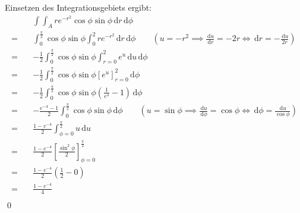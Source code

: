 \documentclass[answers]{exam}
\renewcommand{\d}{\,\mathrm{d}}
\begin{document}
\begin{questions}
\begin{parts}
\begin{solution}
            Einsetzen des Integrationsgebiets ergibt:
            $$
                \begin{aligned}
                           & \int \int_A re^{-r^2}\cos\phi\sin\phi \d r \d \phi                                                                                                                                        \\
                    =\quad & \int_{0}^{\frac{\pi}{2}} \cos\phi\sin\phi \int^2_0 re^{-r^2} \d r \d \phi  \qquad \left(u = -r^2 \implies \frac{\d u}{\d r} = -2r \iff \d r = -\frac{\d u}{2r}\right)                     \\
                    =\quad & -\frac{1}{2} \int_{0}^{\frac{\pi}{2}} \cos\phi\sin\phi \int^2_{r=0} e^{u} \d u \d \phi                                                                                                    \\
                    =\quad & -\frac{1}{2} \int_{0}^{\frac{\pi}{2}} \cos\phi\sin\phi \left[e^u \right]^2_{r=0}  \d \phi                                                                                                 \\
                    =\quad & -\frac{1}{2} \int_{0}^{\frac{\pi}{2}} \cos\phi\sin\phi \left(\frac{1}{e^4} - 1 \right)  \d \phi                                                                                           \\
                    =\quad & -\frac{e^{-4} - 1}{2} \int_{0}^{\frac{\pi}{2}} \cos\phi\sin\phi  \d \phi    \qquad \left(u = \sin\phi \implies \frac{\d u}{\d \phi} = \cos\phi \iff \d\phi = \frac{\d u}{\cos\phi}\right) \\
                    =\quad & \frac{1 - e^{-4}}{2} \int_{\phi = 0}^{\frac{\pi}{2}} u \d u                                                                                                                               \\
                    =\quad & \frac{1 - e^{-4}}{2} \left[\frac{\sin^2\phi}{2}\right]_{\phi = 0}^{\frac{\pi}{2}}                                                                                                         \\
                    =\quad & \frac{1 - e^{-4}}{2} \left(\frac{1}{2} - 0\right)                                                                                                                                         \\
                    =\quad & \frac{1 - e^{-4}}{4}                                                                                                                                                                      \\
                \end{aligned}
            $$\qed
        \end{solution}
    \end{parts}


\end{questions}
\end{document}
